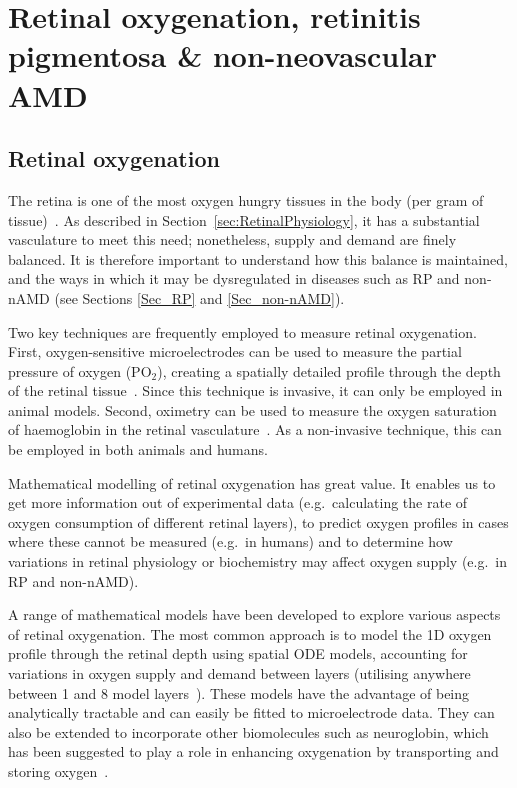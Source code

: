\documentclass{article}
\begin{document}
\section{Retinal oxygenation, retinitis pigmentosa \& non-neovascular AMD}\label{Sec_Ox_RP_non-nAMD}
%
%
\subsection{Retinal oxygenation}\label{Sec_Oxygen}
%
The retina is one of the most oxygen hungry tissues in the body (per gram of tissue)~\cite{Anderson_1968,Anderson_and_Saltzman_1964,Yu_and_Cringle_2001,W-Wirawan_and_Linsenmeier_2003}. As described in Section~\ref{sec:RetinalPhysiology}, it has a substantial vasculature to meet this need; nonetheless, supply and demand are finely balanced. It is therefore important to understand how this balance is maintained, and the ways in which it may be dysregulated in diseases such as RP and non-nAMD (see Sections \ref{Sec_RP} and \ref{Sec_non-nAMD}).

Two key techniques are frequently employed to measure retinal oxygenation. First, oxygen-sensitive microelectrodes can be used to measure the partial pressure of oxygen (PO$_2$), creating a spatially detailed profile through the depth of the retinal tissue~\cite{Linsenmeier_and_Zhang_2017}. Since this technique is invasive, it can only be employed in animal models. Second, oximetry can be used to measure the oxygen saturation of haemoglobin in the retinal vasculature~\cite{Linsenmeier_and_Zhang_2017}. As a non-invasive technique, this can be employed in both animals and humans.

Mathematical modelling of retinal oxygenation has great value. It enables us to get more information out of experimental data (e.g.\ calculating the rate of oxygen consumption of different retinal layers), to predict oxygen profiles in cases where these cannot be measured (e.g.\ in humans) and to determine how variations in retinal physiology or biochemistry may affect oxygen supply (e.g.\ in RP and non-nAMD).

A range of mathematical models have been developed to explore various aspects of retinal oxygenation. The most common approach is to model the 1D oxygen profile through the retinal depth using spatial ODE models, accounting for variations in oxygen supply and demand between layers (utilising anywhere between 1 and 8 model layers~\cite{Braun_et_al_1995,Cringle_and_Yu_2002,Dollery_et_al_1969,Haugh_et_al_1990,Linsenmeier_1986,Stefansson_1988}). These models have the advantage of being analytically tractable and can easily be fitted to microelectrode data. They can also be extended to incorporate other biomolecules such as neuroglobin, which has been suggested to play a role in enhancing oxygenation by transporting and storing oxygen~\cite{Fago_et_al_2004_b,Roberts_et_al_2016a}.
\end{document}
